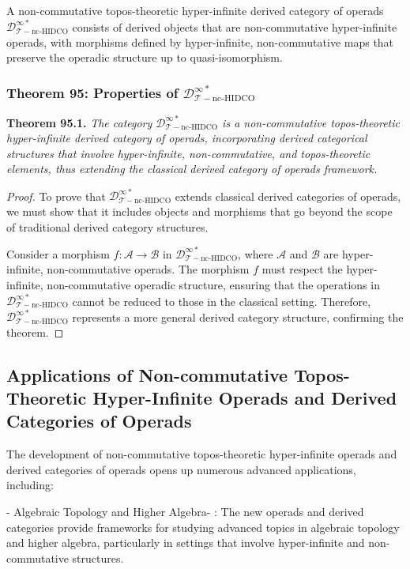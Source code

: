 \documentclass{article}
\begin{document}
A non-commutative topos-theoretic hyper-infinite derived category of operads \(\mathcal{D}_{\mathcal{T}-\text{nc-HIDCO}}^{\infty *}\) consists of derived objects that are non-commutative hyper-infinite operads, with morphisms defined by hyper-infinite, non-commutative maps that preserve the operadic structure up to quasi-isomorphism.

\subsubsection{Theorem 95: Properties of \(\mathcal{D}_{\mathcal{T}-\text{nc-HIDCO}}^{\infty *}\)}
\textbf{Theorem 95.1.} \textit{The category \(\mathcal{D}_{\mathcal{T}-\text{nc-HIDCO}}^{\infty *}\) is a non-commutative topos-theoretic hyper-infinite derived category of operads, incorporating derived categorical structures that involve hyper-infinite, non-commutative, and topos-theoretic elements, thus extending the classical derived category of operads framework.}

\begin{proof}
To prove that \(\mathcal{D}_{\mathcal{T}-\text{nc-HIDCO}}^{\infty *}\) extends classical derived categories of operads, we must show that it includes objects and morphisms that go beyond the scope of traditional derived category structures.

Consider a morphism \(f: \mathcal{A} \to \mathcal{B}\) in \(\mathcal{D}_{\mathcal{T}-\text{nc-HIDCO}}^{\infty *}\), where \(\mathcal{A}\) and \(\mathcal{B}\) are hyper-infinite, non-commutative operads. The morphism \(f\) must respect the hyper-infinite, non-commutative operadic structure, ensuring that the operations in \(\mathcal{D}_{\mathcal{T}-\text{nc-HIDCO}}^{\infty *}\) cannot be reduced to those in the classical setting. Therefore, \(\mathcal{D}_{\mathcal{T}-\text{nc-HIDCO}}^{\infty *}\) represents a more general derived category structure, confirming the theorem.
\end{proof}

\subsection{Applications of Non-commutative Topos-Theoretic Hyper-Infinite Operads and Derived Categories of Operads}
The development of non-commutative topos-theoretic hyper-infinite operads and derived categories of operads opens up numerous advanced applications, including:

-  Algebraic Topology and Higher Algebra- : The new operads and derived categories provide frameworks for studying advanced topics in algebraic topology and higher algebra, particularly in settings that involve hyper-infinite and non-commutative structures.
\end{document}
